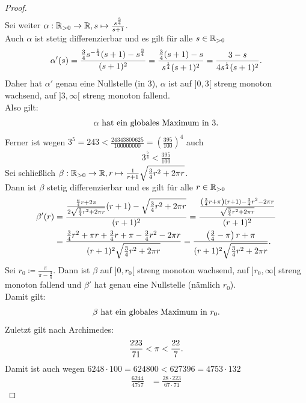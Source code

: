 \begin{proof}
\begin{align}
\label{nleq:2}
\end{align}
Sei weiter
$\alpha:\mathbb{R}_{>0} \rightarrow \mathbb{R}, s \mapsto \frac{s^{\frac 3 4}}{s+1}$.\\
Auch $\alpha$ ist stetig differenzierbar und es gilt für alle $s\in\mathbb{R}_{>0}$
\[\alpha'(s) = \frac{\frac 3 4 s^{-\frac 1 4}(s+1) - s^{\frac 3 4}}{(s+1)^2}
= \frac{\frac 34(s+1)-s}{s^{\frac 14}(s+1)^2}
=\frac{3-s}{4s^{\frac 1 4}(s+1)^2}\text.\]
Daher hat $\alpha'$ genau eine Nullstelle (in 3), $\alpha$ ist auf $]0, 3[$
streng monoton wachsend, auf $]3, \infty[$
streng monoton fallend.\\
Also gilt:
\begin{align}
 \alpha \text{ hat ein globales Maximum in }3\text.\label{nleq:3}
\end{align}
Ferner ist wegen
$3^5=243< \frac{24343800625}{100000000}=\left(\frac{395}{100}\right)^4$
auch 
\begin{align}3^{\frac 5 4} < \frac {395}{100}
\label{nleq:4}
\end{align}
Sei schließlich $\beta: \mathbb{R}_{>0} \rightarrow \mathbb{R},
r \mapsto \frac 1 {r+1}\sqrt{\frac 3 4 r^2 + 2\pi r}$.\\
Dann ist $\beta$ stetig differenzierbar und es gilt für alle
$r \in \mathbb{R}_{>0}$
\begin{align*}
\beta'(r)&=\frac{\frac{\frac 64r+2\pi}{2\sqrt{\frac 34r^2+2\pi r}}(r+1)
 - \sqrt{\frac 3 4 r^2 + 2 \pi r}}
 {(r+1)^2}
 = \frac{\frac{\left(\frac 3 4 r + \pi\right)(r+1)- \frac 3 4 r^2 - 2\pi r}
              {\sqrt{\frac 3 4 r^2 + 2 \pi r}}}{(r+1)^2}\\
 &= \frac{\frac 3 4 r^2 + \pi r + \frac 3 4 r + \pi - \frac 3 4 r^2 - 2 \pi r}
 {(r+1)^2\sqrt{\frac 3 4 r^2 + 2 \pi r}}
= \frac{\left(\frac 34-\pi\right)r+\pi}{(r+1)^2\sqrt{\frac 34r^2+2\pi r}}\text.
\end{align*}
Sei $r_0 \coloneqq  \frac{\pi}{\pi -  \frac 3 4}$. Dann ist $\beta$ auf $]0,r_0[$
streng monoton wachsend, auf $]r_0, \infty[$ streng monoton fallend
und $\beta'$ hat genau eine Nullstelle (nämlich $r_0$).\\
Damit gilt:
\begin{align}
\beta \text{ hat ein globales Maximum in } r_0\text. \label{nleq:5}
\end{align}
Zuletzt gilt nach Archimedes:
\begin{align}\frac {223}{71} < \pi < \frac{22}7\text.
\label{nleq:6}
\end{align}
Damit ist auch wegen $6248\cdot 100 =624800<627396=4753\cdot 132$
\begin{align}\frac{6244}{4757} &=\frac{28\cdot 223}{67\cdot 71}

\end{align}
\end{proof}
